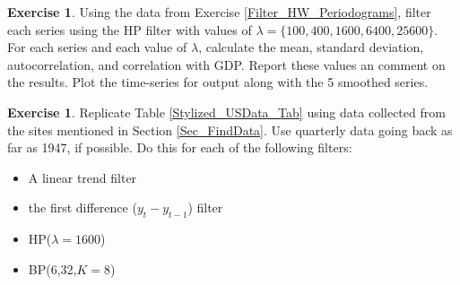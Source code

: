 \documentclass[letterpaper,12pt]{article}
\theoremstyle{definition}
\newtheorem{exercise}[theorem]{Exercise}
\begin{document}
\begin{spacing}{1.5}
    \begin{exercise} \label{Filter_HW_Moments_HP} 
        Using the data from Exercise \ref{Filter_HW_Periodograms}, filter each series using the HP filter with values of $\lambda=\{100,400,1600,6400,25600\}$.  For each series and each value of $\lambda$, 
        calculate the mean, standard deviation, autocorrelation, and correlation with GDP.  Report these values an comment on the results.  Plot the time-series for output along with the 5 smoothed series.
    \end{exercise}
    
    \begin{exercise} \label{Filter_HW_Moments} 
        Replicate Table \ref{Stylized_USData_Tab} using data collected from the sites mentioned in Section \ref{Sec_FindData}.  Use quarterly data going back as far as 1947, if possible.  Do this for each of the following filters: 
        \begin{itemize}
          \setlength\itemsep{0em}
          \item A linear trend filter 
          \item the first difference ($y_t - y_{t-1}$) filter
          \item HP($\lambda=1600$)
          \item BP(6,32,$K=8$)
        \end{itemize}
    \end{exercise}

\end{spacing}

\newpage


\end{document}
